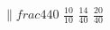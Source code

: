 \documentclass[10pt,letterpaper,addpoints]{exam}
\begin{document}
\begin{multicols}{2}
\begin{questions}
\begin{oneparchoices}
\choice $\|frac{4}{40}$ \choice $\frac{10}{10}$
\CorrectChoice $\frac{14}{40}$ \choice $\frac{20}{40}$
\end{oneparchoices}










\end{questions}
\end{multicols}
\end{document}
